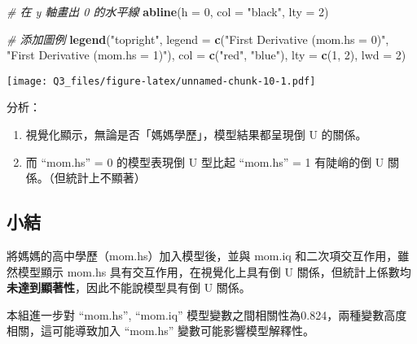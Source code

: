 \documentclass[
]{article}
\newenvironment{Shaded}{\begin{snugshade}}{\end{snugshade}}
\newcommand{\AttributeTok}[1]{\textcolor[rgb]{0.13,0.29,0.53}{#1}}
\newcommand{\CommentTok}[1]{\textcolor[rgb]{0.56,0.35,0.01}{\textit{#1}}}
\newcommand{\DecValTok}[1]{\textcolor[rgb]{0.00,0.00,0.81}{#1}}
\newcommand{\FunctionTok}[1]{\textcolor[rgb]{0.13,0.29,0.53}{\textbf{#1}}}
\newcommand{\NormalTok}[1]{#1}
\newcommand{\StringTok}[1]{\textcolor[rgb]{0.31,0.60,0.02}{#1}}
\providecommand{\tightlist}{%
  \setlength{\itemsep}{0pt}\setlength{\parskip}{0pt}}
\begin{document}
\begin{Shaded}
\begin{Highlighting}[]
\CommentTok{\# 在 y 軸畫出 0 的水平線}
\FunctionTok{abline}\NormalTok{(}\AttributeTok{h =} \DecValTok{0}\NormalTok{, }\AttributeTok{col =} \StringTok{"black"}\NormalTok{, }\AttributeTok{lty =} \DecValTok{2}\NormalTok{)}

\CommentTok{\# 添加圖例}
\FunctionTok{legend}\NormalTok{(}\StringTok{"topright"}\NormalTok{, }\AttributeTok{legend =} \FunctionTok{c}\NormalTok{(}\StringTok{"First Derivative (mom.hs = 0)"}\NormalTok{, }\StringTok{"First Derivative (mom.hs = 1)"}\NormalTok{),}
       \AttributeTok{col =} \FunctionTok{c}\NormalTok{(}\StringTok{"red"}\NormalTok{, }\StringTok{"blue"}\NormalTok{), }\AttributeTok{lty =} \FunctionTok{c}\NormalTok{(}\DecValTok{1}\NormalTok{, }\DecValTok{2}\NormalTok{), }\AttributeTok{lwd =} \DecValTok{2}\NormalTok{)}
\end{Highlighting}
\end{Shaded}

\texttt{[image: Q3\_files/figure-latex/unnamed-chunk-10-1.pdf]}

分析：

\begin{enumerate}
\def\labelenumi{\arabic{enumi}.}
\tightlist
\item
  視覺化顯示，無論是否「媽媽學歷」，模型結果都呈現倒 U 的關係。
\item
  而 ``mom.hs'' = 0 的模型表現倒 U 型比起 ``mom.hs'' = 1 有陡峭的倒 U
  關係。（但統計上不顯著）
\end{enumerate}

\subsection{小結}\label{ux5c0fux7d50-1}

將媽媽的高中學歷（mom.hs）加入模型後，並與 mom.iq
和二次項交互作用，雖然模型顯示 mom.hs 具有交互作用，在視覺化上具有倒 U
關係，但統計上係數均 \textbf{未達到顯著性}，因此不能說模型具有倒 U
關係。

本組進一步對 ``mom.hs'', ``mom.iq''
模型變數之間相關性為0.824，兩種變數高度相關，這可能導致加入 ``mom.hs''
變數可能影響模型解釋性。
\end{document}
